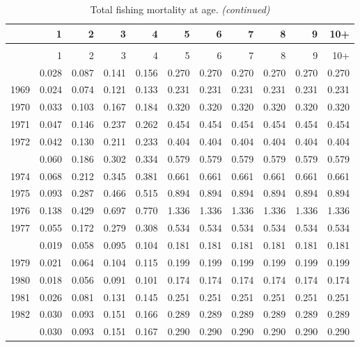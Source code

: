 \documentclass[
]{article}
\begin{document}
\begin{longtable}[t]{lrrrrrrrrrr}
\caption{\label{tab:FAA-tot-table}Total fishing mortality at age.}\\
\toprule
  & 1 & 2 & 3 & 4 & 5 & 6 & 7 & 8 & 9 & 10+\\
\midrule
\endfirsthead
\caption[]{Total fishing mortality at age. \textit{(continued)}}\\
\toprule
  & 1 & 2 & 3 & 4 & 5 & 6 & 7 & 8 & 9 & 10+\\
\midrule
\endhead

\endfoot
\bottomrule
\endlastfoot
1968 & 0.028 & 0.087 & 0.141 & 0.156 & 0.270 & 0.270 & 0.270 & 0.270 & 0.270 & 0.270\\
1969 & 0.024 & 0.074 & 0.121 & 0.133 & 0.231 & 0.231 & 0.231 & 0.231 & 0.231 & 0.231\\
1970 & 0.033 & 0.103 & 0.167 & 0.184 & 0.320 & 0.320 & 0.320 & 0.320 & 0.320 & 0.320\\
1971 & 0.047 & 0.146 & 0.237 & 0.262 & 0.454 & 0.454 & 0.454 & 0.454 & 0.454 & 0.454\\
1972 & 0.042 & 0.130 & 0.211 & 0.233 & 0.404 & 0.404 & 0.404 & 0.404 & 0.404 & 0.404\\
\addlinespace
1973 & 0.060 & 0.186 & 0.302 & 0.334 & 0.579 & 0.579 & 0.579 & 0.579 & 0.579 & 0.579\\
1974 & 0.068 & 0.212 & 0.345 & 0.381 & 0.661 & 0.661 & 0.661 & 0.661 & 0.661 & 0.661\\
1975 & 0.093 & 0.287 & 0.466 & 0.515 & 0.894 & 0.894 & 0.894 & 0.894 & 0.894 & 0.894\\
1976 & 0.138 & 0.429 & 0.697 & 0.770 & 1.336 & 1.336 & 1.336 & 1.336 & 1.336 & 1.336\\
1977 & 0.055 & 0.172 & 0.279 & 0.308 & 0.534 & 0.534 & 0.534 & 0.534 & 0.534 & 0.534\\
\addlinespace
1978 & 0.019 & 0.058 & 0.095 & 0.104 & 0.181 & 0.181 & 0.181 & 0.181 & 0.181 & 0.181\\
1979 & 0.021 & 0.064 & 0.104 & 0.115 & 0.199 & 0.199 & 0.199 & 0.199 & 0.199 & 0.199\\
1980 & 0.018 & 0.056 & 0.091 & 0.101 & 0.174 & 0.174 & 0.174 & 0.174 & 0.174 & 0.174\\
1981 & 0.026 & 0.081 & 0.131 & 0.145 & 0.251 & 0.251 & 0.251 & 0.251 & 0.251 & 0.251\\
1982 & 0.030 & 0.093 & 0.151 & 0.166 & 0.289 & 0.289 & 0.289 & 0.289 & 0.289 & 0.289\\
\addlinespace
1983 & 0.030 & 0.093 & 0.151 & 0.167 & 0.290 & 0.290 & 0.290 & 0.290 & 0.290 & 0.290\\

\end{longtable}
\end{document}
